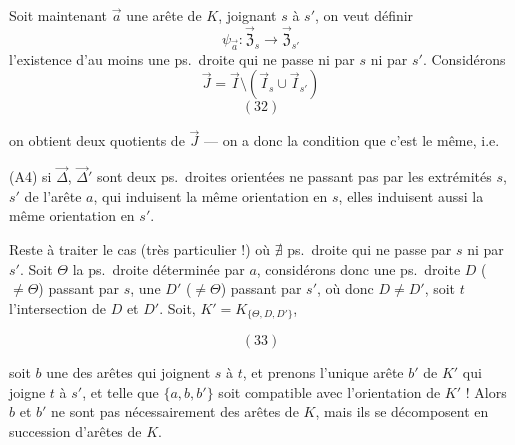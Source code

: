 \documentclass[11pt,a4paper]{article}
\begin{document}
Soit maintenant $\vec{a}$ une arête de $K$, joignant $s$ à $s'$, on veut définir
\[
\psi_{\vec{a}} : \vec{\mathfrak{Z}}_s \longrightarrow \vec{\mathfrak{Z}}_{s'}
\]
  l'existence d'au moins une ps.\ droite qui ne passe ni par $s$ ni par $s'$. Considérons
\[
\vec{J} = \vec{I} \setminus (\vec{I}_s \cup \vec{I}_{s'})
\]
\[
(32)
\]


on obtient deux quotients de $\vec{J}$ --- on a donc la condition que c'est le même, i.e.

(A4) si $\vec{\Delta}$, $\vec{\Delta}'$ sont deux ps.\ droites orientées ne passant pas par les extrémités $s$, $s'$ de l'arête $a$, qui induisent la même orientation en $s$, elles induisent aussi la même orientation en $s'$.

Reste à traiter le cas (très particulier !) où $\nexists$ ps.\ droite \struck{$\Delta$} qui ne passe par $s$ ni par $s'$.
Soit $\Theta$ la ps.\ droite déterminée par $a$, considérons donc une ps.\ droite $D$ ($\neq \Theta$) passant par $s$, une $D'$ ($\neq \Theta$) passant par $s'$,  où donc $D \neq D'$, soit $t$ l'intersection de $D$ et $D'$. Soit,  $K' = K_{\lbrace \Theta, D, D' \rbrace}$,

\[
(33)
\]

soit $b$ une des arêtes qui joignent $s$ à $t$, et prenons l'unique arête $b'$ de $K'$ qui joigne $t$ à $s'$, et telle que $\lbrace a, b, b' \rbrace$ soit compatible avec l'orientation de $K'$ ! Alors $b$ et $b'$ ne sont pas nécessairement des arêtes de $K$, mais ils se décomposent en succession d'arêtes de $K$.
\end{document}
